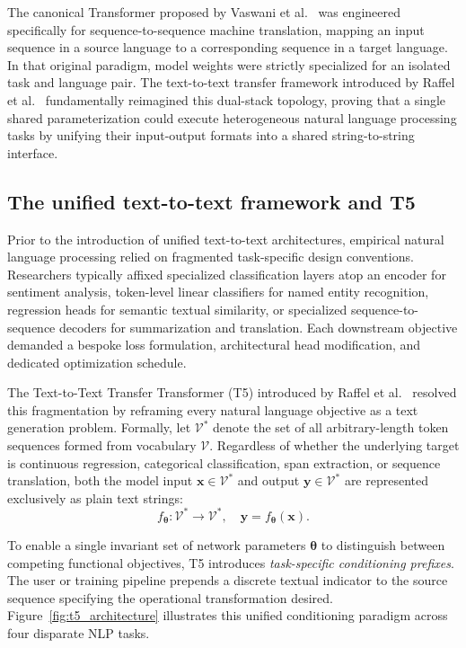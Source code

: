 \documentclass[../../main.tex]{subfiles}
\begin{document}
The canonical Transformer proposed by Vaswani et al.~\cite{vaswani2017} was engineered specifically for sequence-to-sequence machine translation, mapping an input sequence in a source language to a corresponding sequence in a target language. In that original paradigm, model weights were strictly specialized for an isolated task and language pair. The text-to-text transfer framework introduced by Raffel et al.~\cite{raffel2020t5} fundamentally reimagined this dual-stack topology, proving that a single shared parameterization could execute heterogeneous natural language processing tasks by unifying their input-output formats into a shared string-to-string interface.


\subsection{The unified text-to-text framework and T5}
\label{subsec:t5_text_to_text}

Prior to the introduction of unified text-to-text architectures, empirical natural language processing relied on fragmented task-specific design conventions. Researchers typically affixed specialized classification layers atop an encoder for sentiment analysis, token-level linear classifiers for named entity recognition, regression heads for semantic textual similarity, or specialized sequence-to-sequence decoders for summarization and translation. Each downstream objective demanded a bespoke loss formulation, architectural head modification, and dedicated optimization schedule.

The Text-to-Text Transfer Transformer (T5) introduced by Raffel et al.~\cite{raffel2020t5} resolved this fragmentation by reframing every natural language objective as a text generation problem. Formally, let $\mathcal{V}^*$ denote the set of all arbitrary-length token sequences formed from vocabulary $\mathcal{V}$. Regardless of whether the underlying target is continuous regression, categorical classification, span extraction, or sequence translation, both the model input $\mathbf{x} \in \mathcal{V}^*$ and output $\mathbf{y} \in \mathcal{V}^*$ are represented exclusively as plain text strings:
\begin{equation}
f_{\boldsymbol{\theta}}: \mathcal{V}^* \to \mathcal{V}^*, \quad \mathbf{y} = f_{\boldsymbol{\theta}}(\mathbf{x}).
\label{eq:t5_text_to_text_mapping}
\end{equation}

To enable a single invariant set of network parameters $\boldsymbol{\theta}$ to distinguish between competing functional objectives, T5 introduces \emph{task-specific conditioning prefixes}. The user or training pipeline prepends a discrete textual indicator to the source sequence specifying the operational transformation desired. Figure~\ref{fig:t5_architecture} illustrates this unified conditioning paradigm across four disparate NLP tasks.
\end{document}
